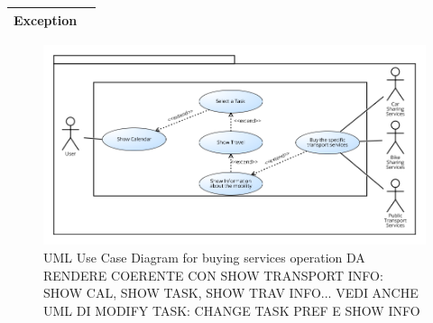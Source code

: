 \begin{table}[H]
\begin{tabular}{|p{3.5cm}|p{10.3cm}|}
    \hline
    \textbf{\large{Exception}} 			& \\
    
    \hline
    
    
    \end{tabular}
	
\end{table}

\begin{figure}[H]
\centering
\includegraphics[scale=0.5]{Pictures/UseCaseDiagram/Buy_services.png}
\caption{UML Use Case Diagram for buying services operation DA RENDERE COERENTE CON SHOW TRANSPORT INFO: SHOW CAL, SHOW TASK, SHOW TRAV INFO... VEDI ANCHE UML DI MODIFY TASK: CHANGE TASK PREF E SHOW INFO}
\end{figure}

